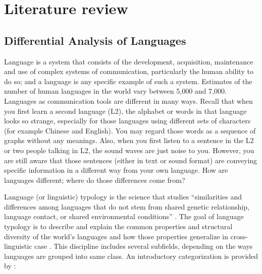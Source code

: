 \chapter{Literature review}
\label{literature}

\section{Differential Analysis of Languages}

Language is a system that consists of the development, acquisition, maintenance and use of complex systems of communication, particularly the human ability to do so; and a language is any specific example of such a system. Estimates of the number of human languages in the world vary between 5,000 and 7,000. Languages as communication tools are different in many ways. Recall that when you first learn a second language (L2), the alphabet or words in that language looks so strange, especially for those languages using different sets of characters (for example Chinese and English). You may regard those words as a sequence of graphs without any meanings. Also, when you first listen to a sentence in the L2 or two people talking in L2, the sound waves are just noise to you. However, you are still aware that those sentences (either in text or sound format) are conveying specific information in a different way from your own language. How are languages different; where do those differences come from?

Language (or linguistic) typology is the science that studies ``similarities and differences among languages that do not stem from shared genetic relationship, language contact, or shared environmental conditions'' \citep{moravcsik_2012}. The goal of language typology is to describe and explain the common properties and structural diversity of the world's languages and how those properties generalize in cross-linguistic case \citep{bickel2001typology}. This discipline includes several subfields, depending on the ways languages are grouped into same class. An introductory categorization is provided by \cite{moravcsik2012introducing}:

